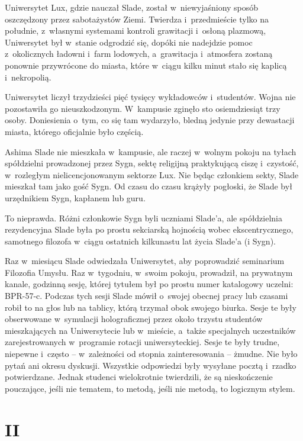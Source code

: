 \documentclass[oneside,polish,11pt,rmheadings]{mwbk}
\begin{document}
Uniwersytet Lux, gdzie nauczał Slade, został w~niewyjaśniony sposób oszczędzony przez sabotażystów Ziemi. Twierdza i~przedmieście tylko na południe, z~własnymi systemami kontroli grawitacji i~osłoną plazmową, Uniwersytet był w~stanie odgrodzić się, dopóki nie nadejdzie pomoc z~okolicznych ładowni i~farm lodowych, a~grawitacja i~atmosfera zostaną ponownie przywrócone do miasta, które w~ciągu kilku minut stało się kaplicą i~nekropolią. 

Uniwersytet liczył trzydzieści pięć tysięcy wykładowców i~studentów. Wojna nie pozostawiła go nieuszkodzonym. W~kampusie zginęło sto osiemdziesiąt trzy osoby. Doniesienia o~tym, co się tam wydarzyło, bledną jedynie przy dewastacji miasta, którego oficjalnie było częścią. 

Ashima Slade nie mieszkała w~kampusie, ale raczej w~wolnym pokoju na tyłach spółdzielni prowadzonej przez Sygn, sektę religijną praktykującą ciszę i~czystość, w~rozległym nielicencjonowanym sektorze Lux. Nie będąc członkiem sekty, Slade mieszkał tam jako gość Sygn.  Od czasu do czasu krążyły pogłoski, że Slade był urzędnikiem Sygn, kapłanem lub guru. 

To nieprawda. Różni członkowie Sygn byli uczniami Slade'a, ale spółdzielnia rezydencyjna Slade była po prostu sekciarską hojnością wobec ekscentrycznego, samotnego filozofa w~ciągu ostatnich kilkunastu lat życia Slade'a (i Sygn). 

Raz w~miesiącu Slade odwiedzała Uniwersytet, aby poprowadzić seminarium Filozofia Umysłu. Raz w~tygodniu, w~swoim pokoju, prowadził, na prywatnym kanale, godzinną sesję, której tytułem był po prostu numer katalogowy uczelni: BPR-57-c. Podczas tych sesji Slade mówił o~swojej obecnej pracy lub czasami robił to na głos lub na tablicy, którą trzymał obok swojego biurka. Sesje te były obserwowane w~symulacji holograficznej przez około trzystu studentów mieszkających na Uniwersytecie lub w~mieście, a~także specjalnych uczestników zarejestrowanych w~programie rotacji uniwersyteckiej. Sesje te były trudne, niepewne i~często -- w~zależności od stopnia zainteresowania -- żmudne. Nie było pytań ani okresu dyskusji. Wszystkie odpowiedzi były wysyłane pocztą i~rzadko potwierdzane. Jednak studenci wielokrotnie twierdzili, że są nieskończenie pouczające, jeśli nie tematem, to metodą, jeśli nie metodą, to logicznym stylem. 

\section*{II}
\end{document}
